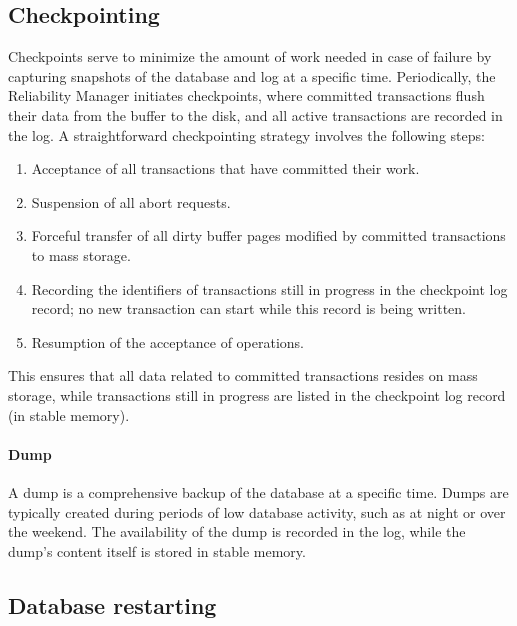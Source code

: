 \subsection{Checkpointing}
Checkpoints serve to minimize the amount of work needed in case of failure by capturing snapshots of the database and log at a specific time.
Periodically, the Reliability Manager initiates checkpoints, where committed transactions flush their data from the buffer to the disk, and all active transactions are recorded in the log.
A straightforward checkpointing strategy involves the following steps:
\begin{enumerate}
    \item Acceptance of all transactions that have committed their work.
    \item Suspension of all abort requests.
    \item Forceful transfer of all dirty buffer pages modified by committed transactions to mass storage.
    \item Recording the identifiers of transactions still in progress in the checkpoint log record; no new transaction can start while this record is being written.
    \item Resumption of the acceptance of operations.
\end{enumerate}
This ensures that all data related to committed transactions resides on mass storage, while transactions still in progress are listed in the checkpoint log record (in stable memory).

\paragraph*{Dump}
A dump is a comprehensive backup of the database at a specific time. 
Dumps are typically created during periods of low database activity, such as at night or over the weekend. 
The availability of the dump is recorded in the log, while the dump's content itself is stored in stable memory.

\subsection{Database restarting}

